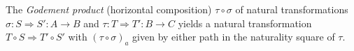 The \emph{Godement product} (horizontal composition) $\tau \circ \sigma$ of natural transformations $\sigma: S \Rightarrow S': A \to B$ and $\tau: T \Rightarrow T': B \to C$ yields a natural transformation $T \circ S \Rightarrow T' \circ S'$ with $(\tau \circ \sigma)_a$ given by either path in the naturality square of $\tau$.

